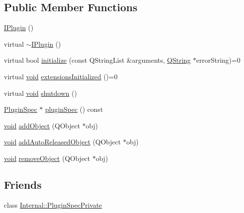 \subsection*{\-Public \-Member \-Functions}
\begin{DoxyCompactItemize}
\item 
\hyperlink{class_extension_system_1_1_i_plugin_a5c43c107b8a3109755cc0e5a26fb5642}{\-I\-Plugin} ()
\item 
virtual \hyperlink{class_extension_system_1_1_i_plugin_a92763c9985354dc46cae781e3873a6b2}{$\sim$\-I\-Plugin} ()
\item 
virtual bool \hyperlink{class_extension_system_1_1_i_plugin_a9f3dc957317279daed393fdf4894e944}{initialize} (const \-Q\-String\-List \&arguments, \hyperlink{group___u_a_v_objects_plugin_gab9d252f49c333c94a72f97ce3105a32d}{\-Q\-String} $\ast$error\-String)=0
\item 
virtual \hyperlink{group___u_a_v_objects_plugin_ga444cf2ff3f0ecbe028adce838d373f5c}{void} \hyperlink{class_extension_system_1_1_i_plugin_a1db3a7fb242fca02229f9a3be4fd6610}{extensions\-Initialized} ()=0
\item 
virtual \hyperlink{group___u_a_v_objects_plugin_ga444cf2ff3f0ecbe028adce838d373f5c}{void} \hyperlink{class_extension_system_1_1_i_plugin_a65c16ebd3a6e89918a99af6515fe68cb}{shutdown} ()
\item 
\hyperlink{class_extension_system_1_1_plugin_spec}{\-Plugin\-Spec} $\ast$ \hyperlink{class_extension_system_1_1_i_plugin_a0406aee58b1b6f47d046a00e8a3968a8}{plugin\-Spec} () const 
\item 
\hyperlink{group___u_a_v_objects_plugin_ga444cf2ff3f0ecbe028adce838d373f5c}{void} \hyperlink{class_extension_system_1_1_i_plugin_a839e08a78deb150b1148ce10d099067b}{add\-Object} (\-Q\-Object $\ast$obj)
\item 
\hyperlink{group___u_a_v_objects_plugin_ga444cf2ff3f0ecbe028adce838d373f5c}{void} \hyperlink{class_extension_system_1_1_i_plugin_af2782659463bdc328aef58f896ae3921}{add\-Auto\-Released\-Object} (\-Q\-Object $\ast$obj)
\item 
\hyperlink{group___u_a_v_objects_plugin_ga444cf2ff3f0ecbe028adce838d373f5c}{void} \hyperlink{class_extension_system_1_1_i_plugin_a7f5bee6ed07af7f475b8b2c55c0d8ed4}{remove\-Object} (\-Q\-Object $\ast$obj)
\end{DoxyCompactItemize}
\subsection*{\-Friends}
\begin{DoxyCompactItemize}
\item 
class \hyperlink{class_extension_system_1_1_i_plugin_ab527aa6637a3541a3260928aef682007}{\-Internal\-::\-Plugin\-Spec\-Private}
\end{DoxyCompactItemize}


